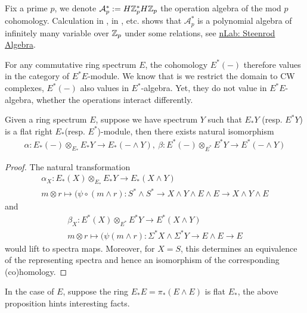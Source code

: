 \begin{example}
\cite{PreSwitzer} 
Fix a prime $p$, we denote $\mathcal{A}_p^*:= H\mathbb{Z}_p^*H\mathbb{Z}_p$ the operation algebra of the mod $p$ cohomology. Calculation in \cite{PreMilnorSteenrod}, in \cite{PreSwitzer}, etc. shows that $\mathcal{A}_p^*$ is a polynomial algebra of infinitely many variable over $\mathbb{Z}_p$ under some relations, see \href{https://ncatlab.org/nlab/show/Steenrod+algebra#presentation_by_generators_and_relations}{nLab: Steenrod Algebra}.
\end{example}
\begin{remark}
For any commutative ring spectrum $E$, the cohomology $E^*(-)$ therefore values in the category of $E^*E$-module. We know that is we restrict the domain to CW complexes, $E^*(-)$ also values in $E^*$-algebra. Yet, they do not value in $E^*E$-algebra, whether the operations interact differently.
\end{remark}


\begin{proposition}
    \cite{PreSwitzer} Given a ring spectrum $E$, suppose we have spectrum $Y$ such that $E_*Y$ (resp. $E^*Y$) is a flat right $E_*$(resp. $E^*$)-module, then there exists natural isomorphism
    \begin{align*}
            \alpha: E_*(-)\otimes_{E_*}E_*Y\to E_*(-\wedge Y),\ \beta: E^*(-)\otimes_{E^*}E^*Y\to E^*(-\wedge Y)
    \end{align*}
\end{proposition}
\begin{proof}
    The natural transformation 
    \begin{align*}
        \alpha_X:  E_*(X)\otimes_{E_*}E_*Y\to E_*(X\wedge Y)
        \\ m\otimes r\mapsto   (\psi \circ (m\wedge r): S^*\wedge S^*\to X\wedge Y \wedge E\wedge E\to X\wedge Y\wedge E
    \end{align*}
    and 
    \begin{align*}
        \beta_X:E^*(X)\otimes_{E^*}E^*Y\to E^*(X\wedge Y)
        \\ m\otimes r\mapsto (\psi(m\wedge r): \Sigma^*X\wedge \Sigma^*Y\to E\wedge E\to E
    \end{align*}
    would lift to spectra maps. Moreover, for $X=S$, this determines an equivalence of the representing spectra and hence an isomorphism of the corresponding (co)homology.
\end{proof}

In the case of $E$, suppose the ring $E_*E=\pi_*(E\wedge E)$ is flat $E_*$, the above proposition hints interesting facts.


